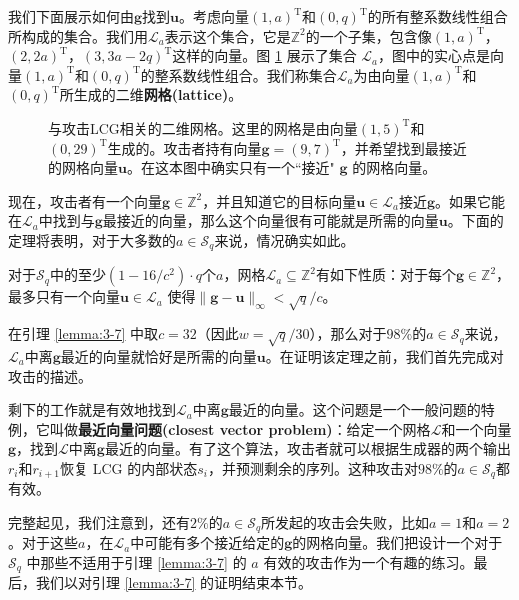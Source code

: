 \begin{snote}[密码分析。]
我们下面展示如何由$\boldsymbol{g}$找到$\boldsymbol{u}$。考虑向量$(1,a)^\mathrm{T}$和$(0,q)^\mathrm{T}$的所有整系数线性组合所构成的集合。我们用$\mathcal{L}_a$表示这个集合，它是$\mathbb{Z}^2$的一个子集，包含像$(1,a)^\mathrm{T}$，$(2,2a)^\mathrm{T}$，$(3,3a-2q)^\mathrm{T}$这样的向量。图 \ref{fig:3-9} 展示了集合 $\mathcal{L}_a$，图中的实心点是向量$(1,a)^\mathrm{T}$和$(0,q)^\mathrm{T}$的整系数线性组合。我们称集合$\mathcal{L}_a$为由向量$(1,a)^\mathrm{T}$和$(0,q)^\mathrm{T}$所生成的二维\textbf{网格(lattice)}。

\begin{figure}
	\centering
	
	\caption{与攻击LCG相关的二维网格。这里的网格是由向量$(1,5)^\mathrm{T}$和$(0,29)^\mathrm{T}$生成的。攻击者持有向量$\boldsymbol{g}=(9,7)^\mathrm{T}$，并希望找到最接近的网格向量$\boldsymbol{u}$。在这本图中确实只有一个``接近" $\boldsymbol{g}$ 的网格向量。}
	\label{fig:3-9}
\end{figure}

现在，攻击者有一个向量$\boldsymbol{g}\in\mathbb{Z}^2$，并且知道它的目标向量$\boldsymbol{u}\in\mathcal{L}_a$接近$\boldsymbol{g}$。如果它能在$\mathcal{L}_a$中找到与$\boldsymbol{g}$最接近的向量，那么这个向量很有可能就是所需的向量$\boldsymbol{u}$。下面的定理将表明，对于大多数的$a\in\mathcal{S}_q$来说，情况确实如此。
\end{snote}

\begin{lemma}\label{lemma:3-7}
对于$\mathcal{S}_q$中的至少$(1-16/c^2)\cdot q$个$a$，网格$\mathcal{L}_a\subseteq\mathbb{Z}^2$有如下性质：对于每个$\boldsymbol{g}\in\mathbb{Z}^2$，最多只有一个向量$\boldsymbol{u}\in\mathcal{L}_a$ 使得$\lVert\boldsymbol{g}-\boldsymbol{u}\rVert_\infty < \sqrt{q}/c$。
\end{lemma}

在引理 \ref{lemma:3-7} 中取$c=32$（因此$w=\sqrt{q}/30$），那么对于$98\%$的$a\in\mathcal{S}_q$来说，$\mathcal{L}_a$中离$\boldsymbol{g}$最近的向量就恰好是所需的向量$\boldsymbol{u}$。在证明该定理之前，我们首先完成对攻击的描述。

剩下的工作就是有效地找到$\mathcal{L}_a$中离$\boldsymbol{g}$最近的向量。这个问题是一个一般问题的特例，它叫做\textbf{最近向量问题(closest vector problem)}：给定一个网格$\mathcal{L}$和一个向量$\boldsymbol{g}$，找到$\mathcal{L}$中离$\boldsymbol{g}$最近的向量。有了这个算法，攻击者就可以根据生成器的两个输出$r_i$和$r_{i+1}$恢复 LCG 的内部状态$s_i$，并预测剩余的序列。这种攻击对$98\%$的$a\in\mathcal{S}_q$都有效。

完整起见，我们注意到，还有$2\%$的$a\in\mathcal{S}_q$所发起的攻击会失败，比如$a=1$和$a=2$。对于这些$a$，在$\mathcal{L}_a$中可能有多个接近给定的$\boldsymbol{g}$的网格向量。我们把设计一个对于 $\mathcal{S}_q$ 中那些不适用于引理 \ref{lemma:3-7} 的 $a$ 有效的攻击作为一个有趣的练习。最后，我们以对引理 \ref{lemma:3-7} 的证明结束本节。

